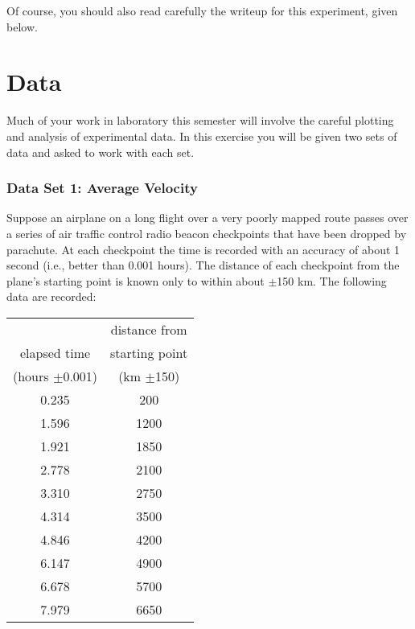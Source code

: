Of course, you should also read carefully the writeup for this experiment, given
below.  


\section*{Data}
    Much of your work in laboratory this semester will involve
the careful plotting and analysis of experimental data.  In this
exercise you will be given two sets of data and asked to
work with each set.
\subsubsection*{Data Set 1:  Average Velocity}
     Suppose an airplane on a long flight over a very poorly
mapped route passes over a series of air traffic control radio
beacon checkpoints that have been dropped by parachute.  At each
checkpoint the time is recorded with an accuracy of about 1
second (i.e., better than 0.001 hours).  The distance of each
checkpoint from the plane's starting point is known only to
within about $\pm$150 km.  The following data are recorded:
\newcommand{\Z}{\phantom{0}}
\begin{center}
\begin{tabular}{|cc|}\hline
 & distance from \\
 elapsed time & starting point \\
 (hours $\pm$0.001) & (km $\pm$150) \\ \hline
 0.235 & \Z200 \\
 1.596 & 1200 \\
 1.921 & 1850 \\
 2.778 & 2100 \\
 3.310 & 2750 \\
 4.314 & 3500 \\
 4.846 & 4200 \\
 6.147 & 4900 \\
 6.678 & 5700 \\
 7.979 & 6650 \\\hline
\end{tabular}
\end{center}
